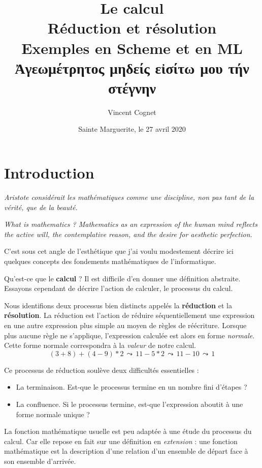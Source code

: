 \documentclass[11pt]{book}
\title{Le calcul \\
     Réduction et résolution \\
	 Exemples en Scheme et en ML \\ \vspace{1cm}
	 \textgreek{Ἀγεωμέτρητος μηδείς  εἰσίτω μου τήν στέγνην }}
\author{Vincent Cognet}
\date{Sainte Marguerite, le 27 avril 2020}
\begin{document}
\maketitle
\tableofcontents

\chapter*{Introduction}

\textit{Aristote considérait les mathématiques comme une discipline, non pas tant de la vérité, que de la beauté.}
\cite{ab}


\textit{What is mathematics ? Mathematics as an expression of the human mind reflects
the active will, the contemplative reason, and the desire for aesthetic perfection.} \cite{wm}


C'est sous cet angle de l'esthétique que j'ai voulu modestement décrire ici quelques concepts 
 des fondements mathématiques de l'informatique.

 \vspace{0.5cm}

Qu'est-ce que le \textbf{calcul} ? Il est difficile d'en donner une définition abstraite. Essayons cependant de 
décrire l'action de calculer, le processus du calcul. 

Nous identifions deux processus bien distincts appelés la \textbf{réduction} et la \textbf{résolution}.
La réduction est l'action de réduire séquentiellement une expression en une autre expression plus simple
au moyen de règles de réécriture. Lorsque plus aucune règle ne s'applique, l'expression calculée est alors en forme
\textit{normale}. Cette forme normale correspondra à la \textit{valeur} de notre calcul.
$$(3+8)+(4-9)*2 \,\leadsto\,  11 -5*2 \, \leadsto\, 11 -10 \,\leadsto\, 1 $$

Ce processus de réduction soulève deux difficultés essentielles : 
\begin{itemize}
	\item La terminaison. Est-que le processus termine en un nombre fini d'étapes ?
	\item La confluence. Si le processus termine, est-que l'expression aboutit à une forme normale unique ?
\end{itemize}
\vspace{0.3cm}
La fonction mathématique usuelle est peu adaptée à une étude du processus du calcul. Car elle
repose en fait sur une définition en \textit{extension} : une fonction mathématique est la 
description d'une relation d'un ensemble de départ face à son ensemble d'arrivée.
\end{document}
